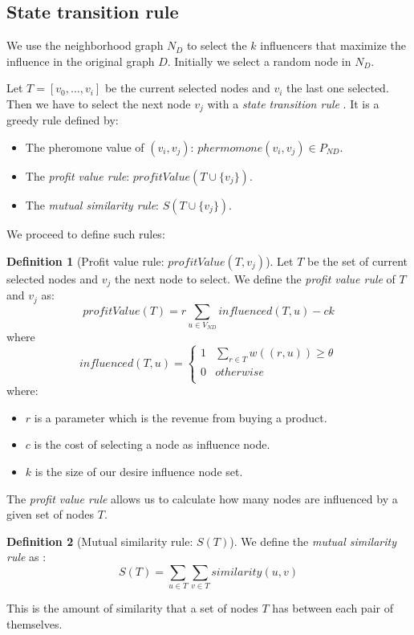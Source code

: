 \documentclass[letter,10pt]{article}
\theoremstyle{definition}
\newtheorem{definition}{Definition}[section]
\begin{document}
\subsection{State transition rule}

We use the neighborhood graph $N_D$ to select the $k$ influencers that maximize the influence in the original graph $D$. Initially we select a random node in $N_D$. 

Let $T=[v_0,\dots,v_i] $ be the current selected nodes and $v_i$ the last one selected. Then we have to select the next node $v_j$ with a \textit{state transition rule }. It is a greedy rule defined by:
\begin{itemize}
    \item The pheromone value of $(v_i, v_j)$: $phermomone(v_i, v_j) \in P_{ND}$.
    \item The \textit{profit value rule}: $profitValue(T \cup \{v_j\})$.
    \item The \textit{mutual similarity rule}: $S(T \cup \{ v_j \})$.
\end{itemize}
We proceed to define such rules:

\begin{definition}[Profit value rule: $profitValue(T,v_j)$] Let $T$ be the set of current selected nodes and $v_j$ the next node to select. We define the \textit{profit value rule} of $T$ and $v_j$ as:
\[ 
    profitValue(T) = r \sum_{u\in V_{ND}} influenced(T , u) - ck 
\]
where 
\[
influenced(T,u) = 
     \begin{cases}
       1 & \sum_{r\in T}w( (r,u) ) \geq \theta\\
       0 & otherwise\\
     \end{cases}
\]
where:
\begin{itemize}
    \item $r$ is a parameter which is the revenue from buying a product.
    \item $c$ is the cost of selecting a node as influence node.
    \item $k$ is the size of our desire influence node set.
\end{itemize}
\end{definition}
The \textit{profit value rule} allows us to calculate how many nodes are influenced by a given set of nodes $T$.

\begin{definition}[Mutual similarity rule: $S(T)$] We define the \textit{mutual similarity rule} as :
\[
    S(T) = \sum_{u\in T}\sum_{v\in T} similarity(u,v)
\]
    
\end{definition}
This is the amount of similarity that a set of nodes $T$ has between each pair of themselves.
\end{document}
